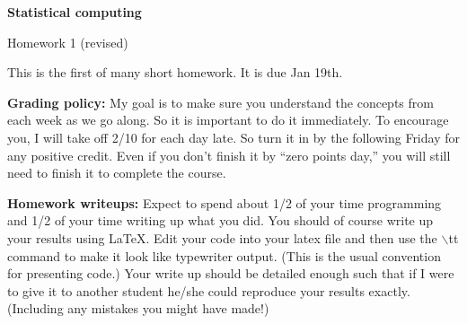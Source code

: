 \renewcommand{\baselinestretch}{1.4}

\centerline{\bf Statistical computing}
\centerline{Homework 1 (revised)}

\vspace{2ex}

This is the first of many short homework.  It is due Jan 19th.  

{\bf Grading policy:} My goal is to make sure you understand the
concepts from each week as we go along.  So it is important to do it
immediately.  To encourage you, I will take off 2/10 for each day
late.  So turn it in by the following Friday for any positive credit.
Even if you don't finish it by ``zero points day,'' you will still
need to finish it to complete the course.

{\bf Homework writeups:} Expect to spend about 1/2 of your time
programming and 1/2 of your time writing up what you did.  You should
of course write up your results using \LaTeX.  Edit your code into
your latex file and then use the $\backslash$tt command to make it look
like typewriter output.  (This is the usual convention for presenting
code.)  Your write up should be detailed enough such that if I were to
give it to another student he/she could reproduce your results
exactly.  (Including any mistakes you might have made!)


